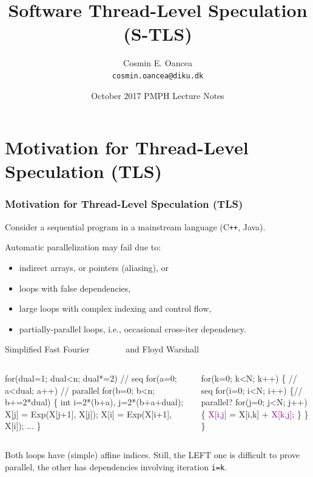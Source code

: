 \documentclass{beamer}
\title[S-TLS]{Software Thread-Level Speculation (S-TLS)}
\author[C.~Oancea]{Cosmin E. Oancea\\{\tt cosmin.oancea@diku.dk}}
\institute{Department of Computer Science (DIKU)\\University of Copenhagen}
\date[Oct'17]{October 2017 PMPH Lecture Notes}
\newcommand{\blue}[1]{\textcolor{Blue}{{#1}}}
\newcommand{\purple}[1]{\textcolor{Purple}{{#1}}}
\newcommand{\emp}[1]{\textcolor{DikuRed}{ #1}}
\newcommand{\emphh}[1]{\textcolor{CosGreen}{ #1}}
\newcommand{\mymath}[1]{$ #1 $}
\begin{document}
\titleslide




\begin{frame}[fragile]
	\tableofcontents
\end{frame}

\section{Motivation for Thread-Level Speculation (TLS)}

\begin{frame}[fragile,t]
  \frametitle{Motivation for Thread-Level Speculation (TLS)}

Consider a sequential program in a mainstream language (C{\tt ++}, Java).

\emp{Automatic parallelization may fail due to:}
\begin{itemize}
    \item indirect arrays, or pointers (aliasing), or
    \item loops with false dependencies,
    \item large loops with complex indexing and control flow,
    \item partially-parallel loops, 
            i.e., occasional cross-iter dependency.
\end  {itemize}\medskip

\begin{block}{Simplified Fast Fourier {\tt~~~~~~~} and Floyd Warshall}
\begin{columns}
\begin{colorcode}
for(dual=1; dual<n; dual*=2) // \emp{seq}
  for(a=0; a<dual; a++) // \emphh{parallel}
    for(b=0; b<n; b+=2*dual)      \{ 
      int i=2*(b+a), j=2*(b+a+dual); 
      X[j] = Exp(X[j+1], X[j]);  
      X[i] = Exp(X[i+1], X[i]); ... 
    \} 
\end{colorcode}
\begin{colorcode}
for(k=0; k<N; k++) \{  // \emp{seq}
  for(i=0; i<N; i++) \{// \emphh{parallel?}
    for(j=0; j<N; j++) \{
      \purple{X[i,j]} = X[i,k] + \purple{X[k,j]};
    \}
  \}
\}
\end{colorcode}
\end{columns}
\end{block} 

\emp{Both loops have (simple) affine indices. Still, the LEFT one
is difficult to prove parallel, the other has 
dependencies involving iteration {\tt i=k}.}

\end{frame}
\end{document}
